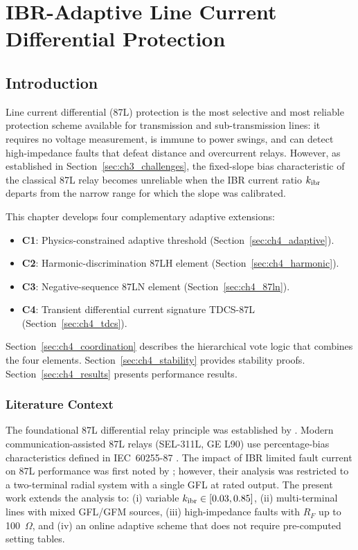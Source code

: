 \chapter{IBR-Adaptive Line Current Differential Protection}
\label{ch:line_diff}

\section{Introduction}
\label{sec:ch4_intro}

Line current differential (87L) protection is the most selective and most
reliable protection scheme available for transmission and sub-transmission
lines: it requires no voltage measurement, is immune to power swings, and
can detect high-impedance faults that defeat distance and overcurrent relays.
However, as established in Section~\ref{sec:ch3_challenges}, the fixed-slope bias
characteristic of the classical 87L relay becomes unreliable when the IBR
current ratio $k_\mathrm{ibr}$ departs from the narrow range for which the slope
was calibrated.

This chapter develops four complementary adaptive extensions:
\begin{itemize}
\item \textbf{C1}: Physics-constrained adaptive threshold (Section~\ref{sec:ch4_adaptive}).
\item \textbf{C2}: Harmonic-discrimination 87LH element (Section~\ref{sec:ch4_harmonic}).
\item \textbf{C3}: Negative-sequence 87LN element (Section~\ref{sec:ch4_87ln}).
\item \textbf{C4}: Transient differential current signature TDCS-87L
      (Section~\ref{sec:ch4_tdcs}).
\end{itemize}

Section~\ref{sec:ch4_coordination} describes the hierarchical vote logic
that combines the four elements. Section~\ref{sec:ch4_stability} provides
stability proofs. Section~\ref{sec:ch4_results} presents performance results.

\subsection{Literature Context}

The foundational 87L differential relay principle was established by
\citet{Westinghouse1962}. Modern communication-assisted 87L relays
(SEL-311L, GE L90) use percentage-bias characteristics defined in
IEC~60255-87 \citep{IEC60255}. The impact of IBR limited fault current on
87L performance was first noted by \citet{Hooshyar2019}; however, their
analysis was restricted to a two-terminal radial system with a single GFL
at rated output. The present work extends the analysis to:
(i) variable $k_\mathrm{ibr} \in [0.03, 0.85]$,
(ii) multi-terminal lines with mixed GFL/GFM sources,
(iii) high-impedance faults with $R_F$ up to 100~$\Omega$, and
(iv) an online adaptive scheme that does not require pre-computed setting
tables.

